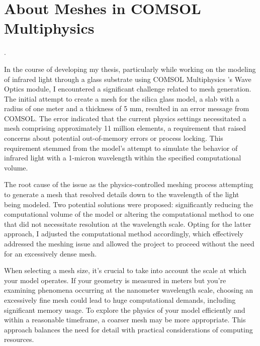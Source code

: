 \section{About Meshes in COMSOL Multiphysics}.

In the course of developing my thesis, particularly while working on the modeling of infrared light through a glass substrate using COMSOL Multiphysics \texttrademark 's Wave Optics module, I encountered a significant challenge related to mesh generation. The initial attempt to create a mesh for the silica glass model, a slab with a radius of one meter and a thickness of 5 mm, resulted in an error message from COMSOL. The error indicated that the current physics settings necessitated a mesh comprising approximately 11 million elements, a requirement that raised concerns about potential out-of-memory errors or process locking. This requirement stemmed from the model's attempt to simulate the behavior of infrared light with a 1-micron wavelength within the specified computational volume.

The root cause of the issue as the physics-controlled meshing process attempting to generate a mesh that resolved details down to the wavelength of the light being modeled. Two potential solutions were proposed: significantly reducing the computational volume of the model or altering the computational method to one that did not necessitate resolution at the wavelength scale. Opting for the latter approach, I adjusted the computational method accordingly, which effectively addressed the meshing issue and allowed the project to proceed without the need for an excessively dense mesh.

When selecting a mesh size, it's crucial to take into account the scale at which your model operates. If your geometry is measured in meters but you're examining phenomena occurring at the nanometer wavelength scale, choosing an excessively fine mesh could lead to huge computational demands, including significant memory usage. To explore the physics of your model efficiently and within a reasonable timeframe, a coarser mesh may be more appropriate. This approach balances the need for detail with practical considerations of computing resources.